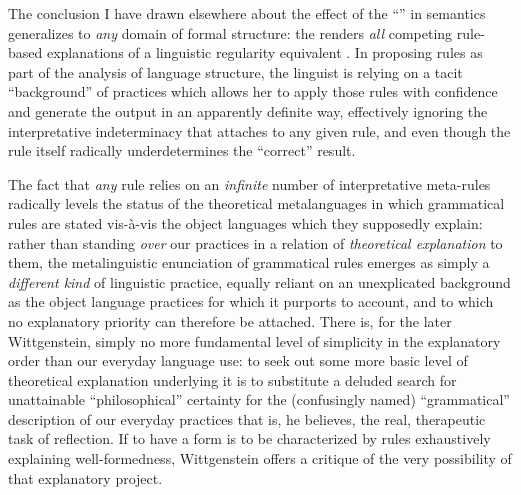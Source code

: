 \documentclass[output=paper]{langscibook}
\begin{document}
The conclusion I have drawn elsewhere about the effect of the ``'' in semantics generalizes to \emph{any} domain of formal structure: the  renders \emph{all} competing rule-based explanations of a linguistic regularity equivalent \citep[52]{Riemer2005}. In proposing rules as part of the analysis of language structure, the linguist is relying on a tacit ``background'' of practices which allows her to apply those rules with confidence and generate the output in an apparently definite way, effectively ignoring the interpretative indeterminacy that attaches to any given rule, and even though the rule itself radically underdetermines the ``correct'' result.

The fact that \emph{any} rule relies on an \emph{infinite} number of interpretative meta-rules radically levels the status of the theoretical metalanguages in which grammatical rules are stated vis-à-vis the object languages which they supposedly explain: rather than standing \emph{over} our  practices in a relation of \emph{theoretical explanation} to them, the metalinguistic enunciation of grammatical rules emerges as simply a \emph{different kind} of linguistic practice, equally reliant on an unexplicated background as the object language practices for which it purports to account, and to which no explanatory priority can therefore be attached. There is, for the later Wittgenstein, simply no more fundamental level of simplicity in the explanatory order than our everyday language use: to seek out some more basic level of theoretical explanation underlying it is to substitute a deluded search for unattainable ``philosophical'' certainty for the (confusingly named) ``grammatical'' description of our everyday practices that is, he believes, the real, therapeutic task of reflection. If to have a form is to be characterized by rules exhaustively explaining well-formedness, Wittgenstein offers a critique of the very possibility of that explanatory project.
\end{document}
